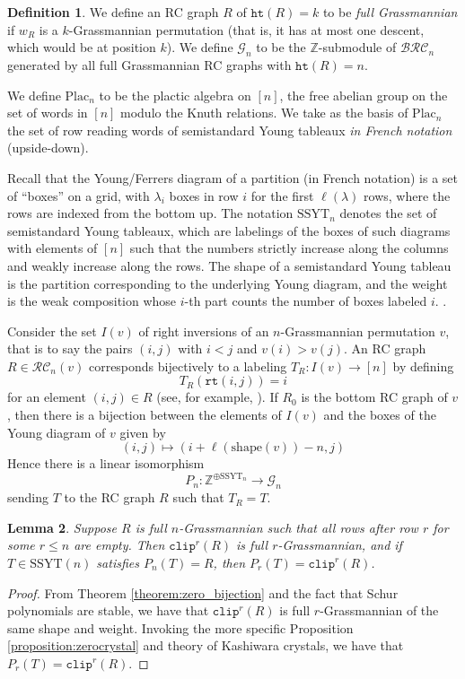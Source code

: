 \documentclass{amsart}
\newtheorem{lemma}{Lemma}[subsection]
\theoremstyle{definition}
\newtheorem{definition}[lemma]{Definition}
\theoremstyle{remark}
\numberwithin{equation}{subsection}
\newcommand{\wof}[1]{w_{#1}}
\newcommand{\grass}{\mathcal{G}}
\newcommand{\plac}{\mathrm{Plac}}
\newcommand{\rtt}{\mathtt{rt}}
\newcommand{\hr}{\mathtt{ht}}
\newcommand{\clp}{\mathtt{clip}}
\newcommand{\BRC}{\mathcal{BRC}}
\newcommand{\RC}{\mathcal{RC}}
\newcommand{\SSYT}{\mathrm{SSYT}}
\begin{document}
\begin{definition}
We define an RC graph $R$ of $\hr(R)=k$ to be \emph{full Grassmannian} if $\wof{R}$ is a $k$-Grassmannian permutation (that is, it has at most one descent, which would be at position $k$). We define $\grass_n$ to be the $\mathbb{Z}$-submodule of $\BRC_n$ generated by all full Grassmannian RC graphs with $\hr(R)= n$.

We define $\plac_n$ to be the plactic algebra on $[n]$, the free abelian group on the set of words in $[n]$ modulo the Knuth relations. We take as the basis of $\plac_n$ the set of row reading words of semistandard Young tableaux \emph{in French notation} (upside-down).

Recall that the Young/Ferrers diagram of a partition (in French notation) is a set of ``boxes'' on a grid, with $\lambda_i$ boxes in row $i$ for the first $\ell(\lambda)$ rows, where the rows are indexed from the bottom up. The notation $\mathrm{SSYT}_n$ denotes the set of semistandard Young tableaux, which are labelings of the boxes of such diagrams with elements of $[n]$ such that the numbers strictly increase along the columns and weakly increase along the rows. The shape of a semistandard Young tableau is the partition corresponding to the underlying Young diagram, and the weight is the weak composition whose $i$-th part counts the number of boxes labeled $i$. .

Consider the set $I(v)$ of right inversions of an $n$-Grassmannian permutation $v$, that is to say the pairs $(i,j)$ with $i<j$ and $v(i)>v(j)$. An RC graph $R\in\RC_n(v)$ corresponds bijectively to a labeling $T_R:I(v)\to [n]$ by defining
$$T_R(\rtt(i,j)) = i$$
for an element $(i,j)\in R$ (see, for example, \cite{axelrodfreed2025inversionstableaux}). If $R_0$ is the bottom RC graph of $v$, then there is a bijection between the elements of $I(v)$ and the boxes of the Young diagram of $v$ given by
$$(i,j) \mapsto (i + \ell(\mathrm{shape}(v)) - n, j)$$
Hence there is a linear isomorphism
$$P_n:\mathbb{Z}^{\oplus\mathrm{SSYT}_n}\to \grass_n$$
sending $T$ to the RC graph $R$ such that $T_R = T$.
\end{definition}

\begin{lemma}
Suppose $R$ is full $n$-Grassmannian such that all rows after row $r$ for some $r\leq n$ are empty. Then $\clp^r(R)$ is full $r$-Grassmannian, and if $T\in \SSYT(n)$ satisfies $P_n(T)=R$, then $P_r(T)=\clp^r(R)$.
\end{lemma}
\begin{proof}
From Theorem \ref{theorem:zero_bijection} and the fact that Schur polynomials are stable, we have that $\clp^r(R)$ is full $r$-Grassmannian of the same shape and weight. Invoking the more specific Proposition \ref{proposition:zerocrystal} and theory of Kashiwara crystals, we have that $P_r(T)=\clp^r(R)$.
\end{proof}
\end{document}
